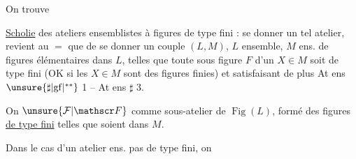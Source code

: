 On trouve

\uline{Scholie} des ateliers  ensemblistes à figures de type fini : se donner un tel atelier, revient au $=$ que de se donner un  couple $(L,M)$, $L$ ensemble, $M$ ens. de figures élémentaires dans $L$, telles que toute sous figure $F$ d'un $X\in M$ soit de type fini (OK si les $X\in M$ sont des figures finies) et satisfaisant de plus At ens $\unsure{\sharp|\mathrm{gf}|{}^{**}}$ 1 -- At ens $\sharp$ 3.

On  $\unsure{\mathcal F|\mathscr F}$ comme sous-atelier de $\operatorname{Fig}(L)$, formé des figures  \uline{de type fini} telles que   soient dans $M$.

Dans le cas d'un atelier ens. pas   de type fini, on 
